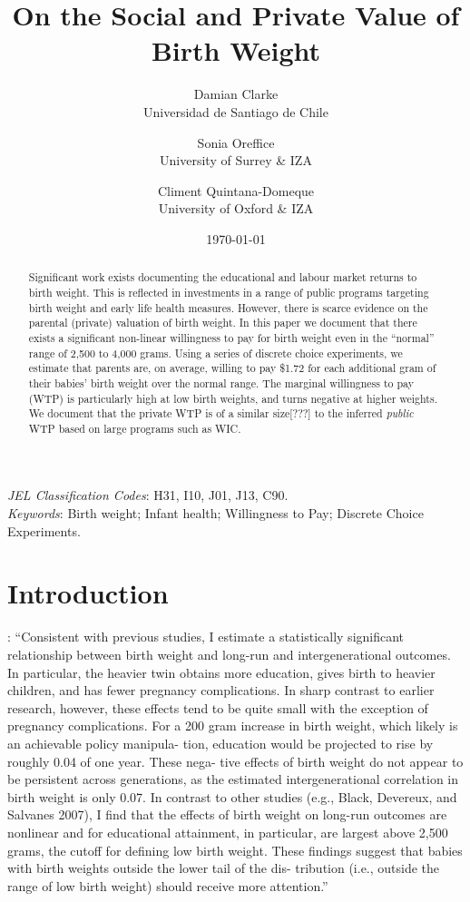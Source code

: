\documentclass[a4paper, 11pt]{article}
\title{On the Social and Private Value of Birth Weight}
\author{\small{Damian Clarke} \\ \small{Universidad de Santiago de Chile} \and \small{Sonia Oreffice} \\ \small{University of Surrey \& IZA}  \and \small{Climent Quintana-Domeque} \\ \small{University of Oxford \& IZA}}
\date{\today}
\begin{document}
\begin{spacing}{1.4}
\maketitle

\begin{abstract}
  Significant work exists documenting the educational and labour market returns
  to birth weight.  This is reflected in investments in a range of public
  programs targeting birth weight and early life health measures.  However,
  there is scarce evidence on the parental (private) valuation of birth
  weight.  In this paper we document that there exists a significant non-linear
  willingness to pay for birth weight even in the ``normal'' range of
  2,500 to 4,000 grams.  Using a series of discrete choice experiments, we
  estimate that parents are, on average, willing to pay \$1.72 for each
  additional gram of their babies' birth weight over the normal range.  The
  marginal willingness to pay (WTP) is particularly high at low birth weights,
  and turns negative at higher weights.  We document that the private WTP is of
  a similar size[???] to the inferred \emph{public} WTP based on large programs such
  as WIC.
\end{abstract}
\emph{JEL Classification Codes}: H31, I10, J01, J13, C90.\\
\emph{Keywords}: Birth weight; Infant health; Willingness to Pay; Discrete
Choice Experiments.

\newpage
\section{Introduction}

\citet{Royer2009}: ``Consistent with previous studies, I estimate a statistically significant relationship
between birth weight and long-run and intergenerational outcomes. In particular,
the heavier twin obtains more education, gives birth to heavier children, and has
fewer pregnancy complications. In sharp contrast to earlier research, however, these
effects tend to be quite small with the exception of pregnancy complications. For a
200 gram increase in birth weight, which likely is an achievable policy manipula-
tion, education would be projected to rise by roughly 0.04 of one year. These nega-
tive effects of birth weight do not appear to be persistent across generations, as the
estimated intergenerational correlation in birth weight is only 0.07. In contrast to
other studies (e.g., Black, Devereux, and Salvanes 2007), I find that the effects of
birth weight on long-run outcomes are nonlinear and for educational attainment, in
particular, are largest above 2,500 grams, the cutoff for defining low birth weight.
These findings suggest that babies with birth weights outside the lower tail of the dis-
tribution (i.e., outside the range of low birth weight) should receive more attention.''


\end{spacing}
\end{document}
